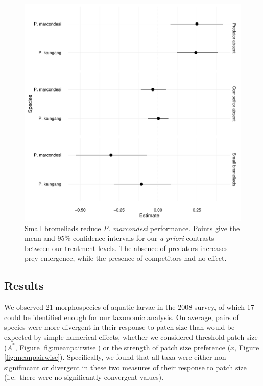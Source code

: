 \begin{figure}[htbp]
\centering
\includegraphics[width=5.5in]{figures/confints.pdf}
\caption[Small bromeliads reduce \emph{P. marcondesi} performance.]{Small bromeliads reduce \emph{P. marcondesi} performance. Points give the mean and 95\% confidence intervals for our \emph{a priori} contrasts between our treatment levels. The absence of predators increases prey emergence, while the presence of competitors had no effect.}
\label{fig:contrasts}
\end{figure}


\subsection{Results}\label{results}

We observed 21 morphospecies of aquatic larvae in the 2008 survey, of
which 17 could be identified enough for our taxonomic analysis. On average, pairs of species were more divergent in their response
to patch size than would be expected by simple numerical effects,
whether we considered threshold patch size (\(A^{*}\), Figure \ref{fig:meanpairwise}) or the
strength of patch size preference (\(x\), Figure \ref{fig:meanpairwise}). Specifically, we
found that all taxa were either non-signifincant or divergent in these two measures
of their response to patch size (i.e.~there were no significantly convergent values).

